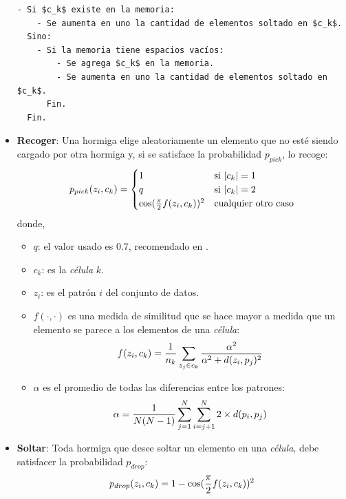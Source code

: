 \begin{itemize}
\begin{lstlisting}[float=h!, caption={Actualización de la Memoria}, label=memory]
- Si $c_k$ existe en la memoria:
    - Se aumenta en uno la cantidad de elementos soltado en $c_k$.
  Sino:
    - Si la memoria tiene espacios vacíos:
        - Se agrega $c_k$ en la memoria.
        - Se aumenta en uno la cantidad de elementos soltado en $c_k$.
      Fin.
  Fin.
\end{lstlisting}
    \item \textbf{Recoger}: Una hormiga elige aleatoriamente un elemento que
no esté siendo cargado por otra hormiga y, si se satisface la probabilidad
$p_{pick}$, lo recoge:
\begin{equation}\label{ant: pick}
p_{pick}(z_i,c_k) = 
\begin{cases}
1 & \text{si } |c_k| = 1 \\
q & \text{si } |c_k| = 2 \\
\cos( {\pi \over 2} f(z_i, c_k) )^2  & \text {cualquier otro caso}
\end{cases}
\end{equation}
donde, 
    \begin{itemize}
        \item $q$: el valor usado es 0.7, recomendado en \cite{OuBa2007}.
        \item $c_k$: es la \emph{célula} $k$.
        \item $z_i$: es el patrón $i$ del conjunto de datos.
        \item $f(\cdot, \cdot)$ es una medida de similitud que se hace mayor a
medida que un elemento se parece a los elementos de una \emph{célula}:
            \begin{equation}\label{ant: f}
              f(z_i,c_k) = {1 \over n_k} \sum_{z_j \in c_k} {\alpha^2 \over {\alpha^2 + d(z_i,p_j)^2}}
            \end{equation}
        \item $\alpha$  es el promedio de todas las diferencias entre los patrones:
            \begin{equation}\label{ant: alpha}
                \alpha = {1 \over {N(N-1)}} \sum_{j=1}^N \sum_{i=j+1}^N {2 \times d(p_i,p_j)}
            \end{equation}
    \end{itemize}
    \item \textbf{Soltar}: Toda hormiga que desee soltar un elemento en una
\emph{célula}, debe satisfacer la probabilidad $p_{drop}$:
        \begin{equation}\label{ant: drop}
            p_{drop}(z_i,c_k) = 1 - \cos( {\pi \over 2} f(z_i, c_k) )^2
        \end{equation}
\end{itemize}

